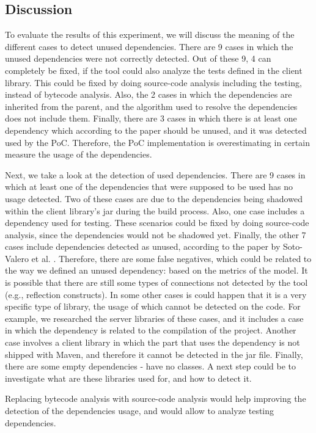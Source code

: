 \subsection{Discussion}
To evaluate the results of this experiment, we will discuss the meaning of the different cases to detect unused dependencies. There are 9 cases in which the unused dependencies were not correctly detected. Out of these 9, 4 can completely be fixed, if the tool could also analyze the tests defined in the client library. This could be fixed by doing source-code analysis including the testing, instead of bytecode analysis. Also, the 2 cases in which the dependencies are inherited from the parent, and the algorithm used to resolve the dependencies does not include them. Finally, there are 3 cases in which there is at least one dependency which according to the paper should be unused, and it was detected used by the PoC. Therefore, the PoC implementation is overestimating in certain measure the usage of the dependencies.

Next, we take a look at the detection of used dependencies. There are 9 cases in which at least one of the dependencies that were supposed to be used has no usage detected. Two of these cases are due to the dependencies being shadowed within the client library's jar during the build process. Also, one case includes a dependency used for testing. These scenarios could be fixed by doing source-code analysis, since the dependencies would not be shadowed yet. Finally, the other 7 cases include dependencies detected as unused, according to the paper by Soto-Valero et al. \cite{soto2020comprehensive}. Therefore, there are some false negatives, which could be related to the way we defined an unused dependency: based on the metrics of the model. It is possible that there are still some types of connections not detected by the tool (e.g., reflection constructs). In some other cases is could happen that it is a very specific type of library, the usage of which cannot be detected on the code. For example, we researched the server libraries of these cases, and it includes a case in which the dependency is related to the compilation of the project. Another case involves a client library in which the part that uses the dependency is not shipped with Maven, and therefore it cannot be detected in the jar file. Finally, there are some empty dependencies - have no classes. A next step could be to investigate what are these libraries used for, and how to detect it.

\begin{finding}
	Replacing bytecode analysis with source-code analysis would help improving the detection of the dependencies usage, and would allow to analyze testing dependencies.
	\label{find:source-code-analysis}
\end{finding}

